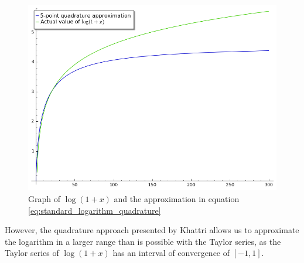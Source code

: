 \begin{figure}[!ht]
		\centering
		\includegraphics[width=.8\linewidth]{figures/StandardQuadrature.png}
		\caption{Graph of $\log{(1+x)}$ and the approximation in equation \ref{eq:standard_logarithm_quadrature}}
		\label{fig:standard_logarithm_quadrature}
\end{figure}

However, the quadrature approach presented by Khattri allows us to approximate the logarithm in a larger range than is possible with the Taylor series, as the Taylor series of $\log(1+x)$ has an interval of convergence of $[-1,1]$.
